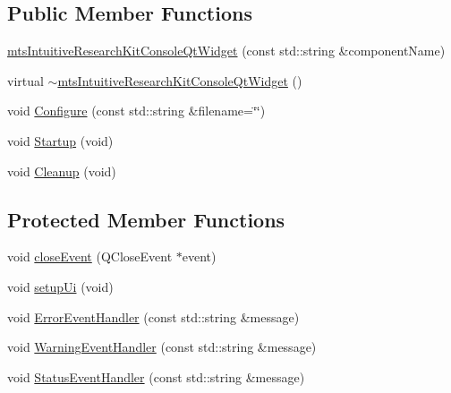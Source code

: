 \subsection*{Public Member Functions}
\begin{DoxyCompactItemize}
\item 
\hyperlink{classmts_intuitive_research_kit_console_qt_widget_a95818a1c10f8ab69daef0a2289ccd574}{mts\-Intuitive\-Research\-Kit\-Console\-Qt\-Widget} (const std\-::string \&component\-Name)
\item 
virtual \hyperlink{classmts_intuitive_research_kit_console_qt_widget_acfc0c03dfd5a161a4abdbc702b83a73d}{$\sim$mts\-Intuitive\-Research\-Kit\-Console\-Qt\-Widget} ()
\item 
void \hyperlink{classmts_intuitive_research_kit_console_qt_widget_a3b08a78bd3b7c7296d28e09ff8216d03}{Configure} (const std\-::string \&filename=\char`\"{}\char`\"{})
\item 
void \hyperlink{classmts_intuitive_research_kit_console_qt_widget_a47f4e75b8867bedffd54088eb96fa5bf}{Startup} (void)
\item 
void \hyperlink{classmts_intuitive_research_kit_console_qt_widget_a182bd380efd6025e05fbac7f21a27dbd}{Cleanup} (void)
\end{DoxyCompactItemize}
\subsection*{Protected Member Functions}
\begin{DoxyCompactItemize}
\item 
void \hyperlink{classmts_intuitive_research_kit_console_qt_widget_abde2dbe3d6edb810072fc25c10b614ec}{close\-Event} (Q\-Close\-Event $\ast$event)
\item 
void \hyperlink{classmts_intuitive_research_kit_console_qt_widget_aa5814a625ee98f9217810e880632d546}{setup\-Ui} (void)
\item 
void \hyperlink{classmts_intuitive_research_kit_console_qt_widget_a987faa09de36b685a4e37b75062c7e27}{Error\-Event\-Handler} (const std\-::string \&message)
\item 
void \hyperlink{classmts_intuitive_research_kit_console_qt_widget_a8a82a591238e6fa12e15db7387dce104}{Warning\-Event\-Handler} (const std\-::string \&message)
\item 
void \hyperlink{classmts_intuitive_research_kit_console_qt_widget_adbee1e7299c15578a074ff7390f4806f}{Status\-Event\-Handler} (const std\-::string \&message)
\end{DoxyCompactItemize}
